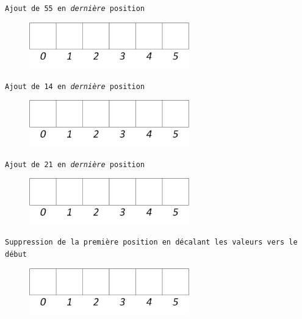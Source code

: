\documentclass[11pt,a4paper]{article}
\begin{document}
\begin{center}

\texttt{Ajout de 55 en \textit{dernière} position}

\begin{figure}[ht!]
\centering
\centerline{  %
\includegraphics[height=2cm]{img/Liste_t_vide.png}
}
\end{figure}


\texttt{Ajout de 14 en \textit{dernière} position}

\begin{figure}[ht!]
\centering
\centerline{  %
\includegraphics[height=2cm]{img/Liste_t_vide.png}
}
\end{figure}


\texttt{Ajout de 21 en \textit{dernière} position}

\begin{figure}[ht!]
\centering
\centerline{  %
\includegraphics[height=2cm]{img/Liste_t_vide.png}
}
\end{figure}


\texttt{Suppression de la première position en décalant les valeurs vers le début}

\begin{figure}[ht!]
\centering
\centerline{  %
\includegraphics[height=2cm]{img/Liste_t_vide.png}
}
\end{figure}



\end{center}
\end{document}
